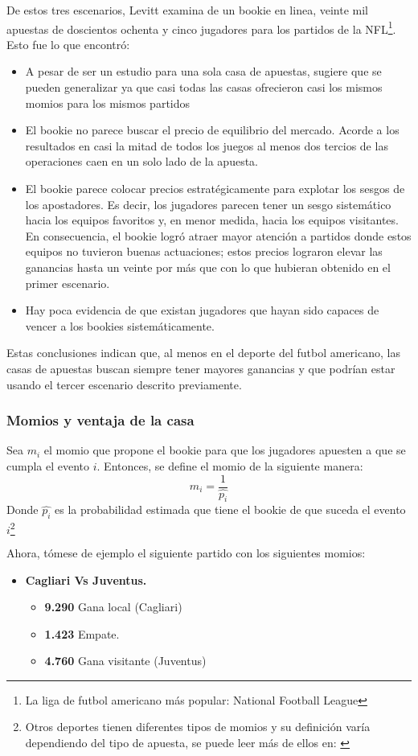 De estos tres escenarios, Levitt \cite{levitt2004gambling} examina de un bookie en linea, veinte mil apuestas de doscientos ochenta y cinco jugadores para los partidos de la NFL\footnote{La liga de futbol americano más popular: National Football League}. Esto fue lo que encontró:
\begin{itemize}
	\item A pesar de ser un estudio para una sola casa de apuestas, sugiere que se pueden generalizar ya que casi todas las casas ofrecieron casi los mismos momios para los mismos partidos
	\item El bookie no parece buscar el precio de equilibrio del mercado. Acorde a los resultados en casi la mitad de todos los juegos al menos dos tercios de las operaciones caen en un solo lado de la apuesta.
	\item El bookie parece colocar precios estratégicamente para explotar los sesgos de los apostadores. Es decir, los jugadores parecen tener un sesgo sistemático hacia los equipos favoritos y, en menor medida, hacia los equipos visitantes. En consecuencia, el bookie logró atraer mayor atención a partidos donde estos equipos no tuvieron buenas actuaciones; estos precios lograron elevar las ganancias hasta un veinte por más que con lo que hubieran obtenido en el primer escenario.
	\item Hay poca evidencia de que existan jugadores que hayan sido capaces de vencer a los bookies sistemáticamente.
 \end{itemize}
 
Estas conclusiones indican que, al menos en el deporte del futbol americano, las casas de apuestas buscan siempre tener mayores ganancias y que podrían estar usando el tercer escenario descrito previamente. 

\subsubsection{Momios y ventaja de la casa}
Sea $m_i$ el momio que propone el bookie para que los jugadores apuesten a que se cumpla el evento $i$. Entonces, se define el momio de la siguiente manera:
\[m_i = \frac{1}{\hat{p_i}}\]
Donde $\hat{p_i}$ es la probabilidad estimada que tiene el bookie de que suceda el evento $i$\footnote{Otros deportes tienen diferentes tipos de momios y su definición varía dependiendo del tipo de apuesta, se puede leer más de ellos en: \cite{ignatin1984sports}}

Ahora, tómese de ejemplo el siguiente partido con los siguientes momios:
\begin{itemize}

\item \textbf{Cagliari Vs Juventus.}
	\begin{itemize}
		\item \textbf{9.290} Gana local (Cagliari)
		\item \textbf{1.423} Empate.
		\item \textbf{4.760} Gana visitante (Juventus)
	\end{itemize}
\end{itemize}

